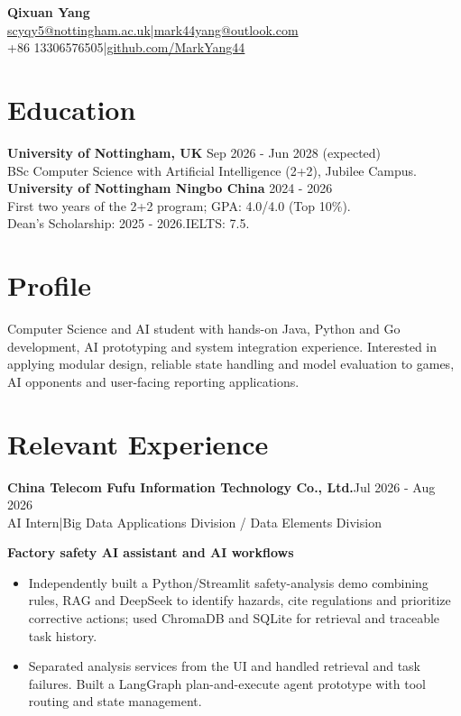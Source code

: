 \documentclass[11pt,a4paper]{article}
\newcommand{\project}[1]{\par\vspace{2pt}\textbf{#1}\par}
\begin{document}
\begin{center}
{\LARGE\bfseries\color{navy} Qixuan Yang}\\[3pt]
{\small\href{mailto:scyqy5@nottingham.ac.uk}{scyqy5@nottingham.ac.uk}\enspace|\enspace\href{mailto:mark44yang@outlook.com}{mark44yang@outlook.com}\\[2pt]
+86 13306576505\enspace|\enspace\href{https://github.com/MarkYang44}{github.com/MarkYang44}}
\end{center}

\section*{Education}
\textbf{University of Nottingham, UK} \hfill Sep 2026 - Jun 2028 (expected)\\
BSc Computer Science with Artificial Intelligence (2+2), Jubilee Campus.\\[2pt]
\textbf{University of Nottingham Ningbo China} \hfill 2024 - 2026\\
First two years of the 2+2 program; GPA: 4.0/4.0 (Top 10\%).\\
Dean's Scholarship: 2025 - 2026.\quad IELTS: 7.5.

\section*{Profile}
Computer Science and AI student with hands-on Java, Python and Go development, AI prototyping and system integration experience. Interested in applying modular design, reliable state handling and model evaluation to games, AI opponents and user-facing reporting applications.

\section*{Relevant Experience}
\textbf{China Telecom Fufu Information Technology Co., Ltd.}\hfill Jul 2026 - Aug 2026\\
AI Intern\enspace|\enspace Big Data Applications Division / Data Elements Division

\project{Factory safety AI assistant and AI workflows}
\begin{itemize}
\item Independently built a Python/Streamlit safety-analysis demo combining rules, RAG and DeepSeek to identify hazards, cite regulations and prioritize corrective actions; used ChromaDB and SQLite for retrieval and traceable task history.
\item Separated analysis services from the UI and handled retrieval and task failures. Built a LangGraph plan-and-execute agent prototype with tool routing and state management.
\end{itemize}
\end{document}
